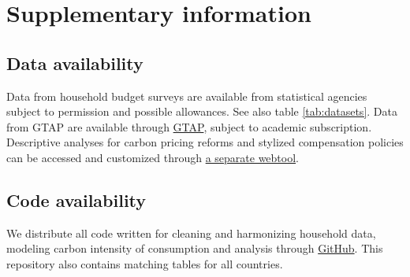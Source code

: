\documentclass[12pt, a4paper]{article}
\begin{document}
\begin{refsection}

\clearpage


\clearpage


\clearpage


\clearpage


\clearpage


\clearpage


\clearpage

\begin{refcontext}[sorting=nyt]
\printbibliography[heading=subbibliography, title ={References (Appendix)}]
\end{refcontext}
\end{refsection}

\clearpage

\section{Supplementary information}

\subsection{Data availability} \label{data_availability} Data from household budget surveys are available from statistical agencies subject to permission and possible allowances. See also table \ref{tab:datasets}. Data from GTAP are available through \href{https://www.gtap.agecon.purdue.edu/}{GTAP}, subject to academic subscription.
Descriptive analyses for carbon pricing reforms and stylized compensation policies can be accessed and customized through \href{https://https://www.cpic-global.net/}{a separate webtool}.

\subsection{Code availability} \label{code}
We distribute all code written for cleaning and harmonizing household data, modeling carbon intensity of consumption and analysis through \href{https://github.com/lmissbach/Carbon-Intensity-2023}{GitHub}. This repository also contains matching tables for all countries.
\end{document}
